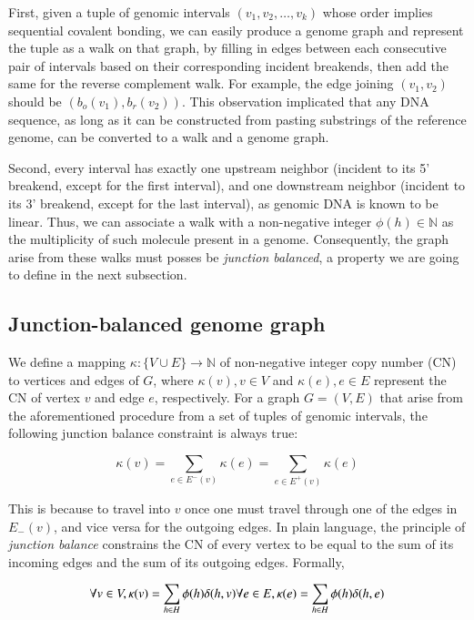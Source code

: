 \documentclass[phd,tocprelim]{cornell}
\begin{document}
First, given a tuple of genomic intervals $(v_1, v_2, \dots, v_k)$ whose order implies sequential covalent bonding, we can easily produce a genome graph and represent the tuple as a walk on that graph, by filling in edges between each consecutive pair of intervals based on their corresponding incident breakends, then add the same for the reverse complement walk. For example, the edge joining $(v_1, v_2)$ should be $(b_o(v_1), b_r(v_2))$. This observation implicated that any DNA sequence, as long as it can be constructed from pasting substrings of the reference genome, can be converted to a walk and a genome graph.

Second, every interval has exactly one upstream neighbor (incident to its 5' breakend, except for the first interval), and one downstream neighbor (incident to its 3' breakend, except for the last interval), as genomic DNA is known to be linear. Thus, we can associate a walk with a non-negative integer $\phi(h) \in \mathbb{N}$ as the multiplicity of such molecule present in a genome. Consequently, the graph arise from these walks must posses be \textit{junction balanced}, a property we are going to define in  the next subsection.

\subsection{Junction-balanced genome graph} \label{sub:JBGG}
We define a mapping $\kappa:\{V \cup E\}\rightarrow \mathbb{N}$ of non-negative integer copy number (CN) to vertices and edges of $G$, where $\kappa(v),v \in V$ and  $\kappa(e),e \in E$ represent the CN of vertex $v$ and edge $e$, respectively. For a graph $G = (V, E)$ that arise from the aforementioned procedure from a set of tuples of genomic intervals, the following junction balance constraint is always true:

\begin{equation} \label{eq:junction_balance_constraint}
    \kappa(v)= \sum_{e\in E^-(v)} \kappa(e) = \sum_{e\in E^+(v)} \kappa(e)
\end{equation}

This is because to travel into $v$ once one must travel through one of the edges in $E_{-}(v)$, and vice versa for the outgoing edges. In plain language, the principle of \textit{junction balance} constrains the CN of every vertex to be equal to the sum of its incoming edges and the sum of its outgoing edges. Formally, 

\begin{equation} \label{eq:sum_of_walk}
    \forall v \in V, \kappa(v) = \sum_{h \in H}\phi(h)\delta(h, v) \\
    \forall e \in E, \kappa(e) = \sum_{h \in H}\phi(h)\delta(h, e)
\end{equation}
\end{document}
